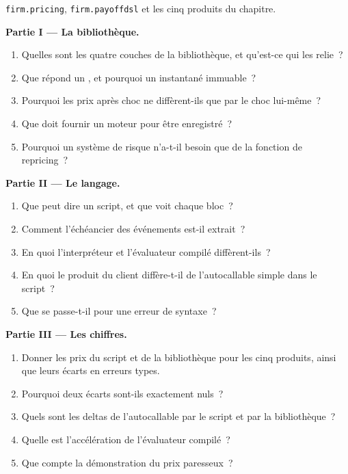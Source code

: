 \begin{problem}\label{pb:pl:pricing-library-architecture:1}
\texttt{firm.pricing}, \texttt{firm.payoffdsl} et les cinq produits du chapitre.

\medskip\noindent\textbf{Partie I --- La bibliothèque.}
\begin{enumerate}
\item Quelles sont les quatre couches de la bibliothèque, et qu'est-ce qui les relie~?
\item Que répond un , et pourquoi un instantané immuable~?
\item Pourquoi les prix après choc ne diffèrent-ils que par le choc lui-même~?
\item Que doit fournir un moteur pour être enregistré~?
\item Pourquoi un système de risque n'a-t-il besoin que de la fonction de repricing~?
\end{enumerate}

\medskip\noindent\textbf{Partie II --- Le langage.}
\begin{enumerate}[resume]
\item Que peut dire un script, et que voit chaque bloc~?
\item Comment l'échéancier des événements est-il extrait~?
\item En quoi l'interpréteur et l'évaluateur compilé diffèrent-ils~?
\item En quoi le produit du client diffère-t-il de l'autocallable simple dans le script~?
\item Que se passe-t-il pour une erreur de syntaxe~?
\end{enumerate}

\medskip\noindent\textbf{Partie III --- Les chiffres.}
\begin{enumerate}[resume]
\item Donner les prix du script et de la bibliothèque pour les cinq produits, ainsi que leurs écarts en erreurs types.
\item Pourquoi deux écarts sont-ils exactement nuls~?
\item Quels sont les deltas de l'autocallable par le script et par la bibliothèque~?
\item Quelle est l'accélération de l'évaluateur compilé~?
\item Que compte la démonstration du prix paresseux~?
\end{enumerate}


\end{problem}
